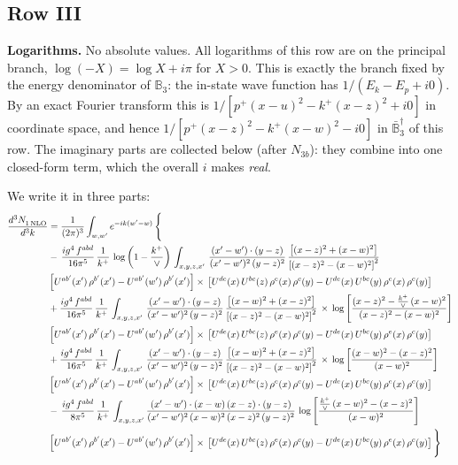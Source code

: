 \documentclass[9pt]{article}
\numberwithin{equation}{section}
\begin{document}
\subsection{Row III}
{\color{red}\textbf{Logarithms.} No absolute values. All logarithms of this row are on the principal branch, $\log(-X)=\log X+i\pi$ for $X>0$. This is exactly the branch fixed by the energy denominator of $\mathbb B_{3}$: the in-state wave function has $1/(E_{k}-E_{p}+i0)$. By an exact Fourier transform this is $1/[p^{+}(x-u)^{2}-k^{+}(x-z)^{2}+i0]$ in coordinate space, and hence $1/[p^{+}(x-z)^{2}-k^{+}(x-w)^{2}-i0]$ in $\bar{\mathbb B}^{\dagger}_{3}$ of this row. The imaginary parts are collected below (after $N_{3b}$): they combine into one closed-form term, which the overall $i$ makes \emph{real}.}

We write it in three parts:
\begin{align}
   \frac{d^{3}N_{1\,\rm NLO}^{\rm}}{d^{3}k}  & =  \frac{1}{(2\pi)^{3}}  \int_{w, w^\prime} e^{-ik(w^\prime-w)}\, \Bigg\{\notag \\
& -\,\frac{ig^{4}\,f^{abd}}{16\pi^{5}}\,\frac{1}{k^{+}}\,\log{\left(1-\frac{k^{+}}{\vee}\right)}\,\int_{x,y,z,x'}\, \frac{(x'-w')\cdot (y-z)}{(x'-w')^{2}\,(y-z)^{2}}\,\frac{\left[(x-z)^{2}+(x-w)^{2}\right]}{\left[(x-z)^{2}-(x-w)^{2}\right]^{2}}\notag \\ & \left[U^{ab'}(x')\,\rho^{b'}(x')-U^{ab'}(w')\, \rho^{b'}(x')\right]\times\, \left[U^{de}(x)\,U^{bc}(z)\, \rho^{e}(x)\,\rho^{c}(y)-U^{de}(x)\,U^{bc}(y)\,\rho^{e}(x)\,\rho^{c}(y)\right] \notag \\
&  +\frac{ig^{4}\,f^{abd}}{16\pi^{5}}\, \frac{1}{k^{+}}\,\int_{x,y,z,x'}\, \frac{(x'-w')\cdot (y-z)}{(x'-w')^{2}\,(y-z)^{2}}\, \frac{\left[(x-w)^{2}+(x-z)^{2}\right]}{\left[(x-z)^{2}-(x-w)^{2}\right]^{2}}\, \times\, \log{\left[\frac{(x-z)^{2}-\frac{k^{+}}{\vee}\,(x-w)^{2}}{(x-z)^{2}-(x-w)^{2}}\right]}\notag \\ & \left[U^{ab'}(x')\,\rho^{b'}(x')-U^{ab'}(w')\, \rho^{b'}(x')\right]\times\, \left[U^{de}(x)\,U^{bc}(z)\, \rho^{e}(x)\,\rho^{c}(y)-U^{de}(x)\,U^{bc}(y)\,\rho^{e}(x)\,\rho^{c}(y)\right] \notag \\
&  +\frac{ig^{4}\,f^{abd}}{16\pi^{5}}\, \frac{1}{k^{+}}\,\int_{x,y,z,x'}\, \frac{(x'-w')\cdot (y-z)}{(x'-w')^{2}\,(y-z)^{2}}\, \frac{\left[(x-w)^{2}+(x-z)^{2}\right]}{\left[(x-z)^{2}-(x-w)^{2}\right]^{2}}\, \times\, \log{\left[\frac{(x-w)^{2}-(x-z)^{2}}{(x-w)^{2}}\right]}\notag \\ & \left[U^{ab'}(x')\,\rho^{b'}(x')-U^{ab'}(w')\, \rho^{b'}(x')\right]\times\, \left[U^{de}(x)\,U^{bc}(z)\, \rho^{e}(x)\,\rho^{c}(y)-U^{de}(x)\,U^{bc}(y)\,\rho^{e}(x)\,\rho^{c}(y)\right] \notag \\
&-\, \frac{ig^{4}\,f^{abd}}{8\pi^{5}}\,\frac{1}{k^{+}}\,\int_{x,y,z,x'}\frac{(x'-w')\cdot (x-w)\, (x-z)\cdot (y-z)}{(x'-w')^{2}\, (x-w)^{2}\, (x-z)^{2}\, (y-z)^{2}}\,\log{\left[\frac{\frac{k^{+}}{\vee}\,(x-w)^{2}-(x-z)^{2}}{(x-w)^{2}}\right]} \notag \\ & \left[U^{ab'}(x')\,\rho^{b'}(x')-U^{ab'}(w')\, \rho^{b'}(x')\right]\times\, \left[U^{de}(x)\,U^{bc}(z)\, \rho^{e}(x)\,\rho^{c}(y)-U^{de}(x)\,U^{bc}(y)\,\rho^{e}(x)\,\rho^{c}(y)\right]\Bigg\}
\end{align}
\end{document}
